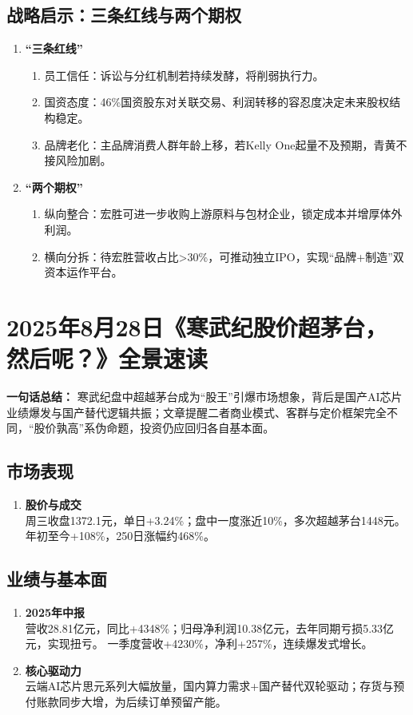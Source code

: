 \subsection{战略启示：三条红线与两个期权}
\begin{enumerate}[leftmargin=*, nosep]
    \item \textbf{“三条红线”  }
    \begin{enumerate}[label=\arabic*)]  
        \item 员工信任：诉讼与分红机制若持续发酵，将削弱执行力。  
        \item 国资态度：46\%国资股东对关联交易、利润转移的容忍度决定未来股权结构稳定。  
        \item 品牌老化：主品牌消费人群年龄上移，若Kelly One起量不及预期，青黄不接风险加剧。
    \end{enumerate}
    \item \textbf{“两个期权”}  
    \begin{enumerate}[label=\arabic*)]  
        \item 纵向整合：宏胜可进一步收购上游原料与包材企业，锁定成本并增厚体外利润。  
        \item 横向分拆：待宏胜营收占比>30\%，可推动独立IPO，实现“品牌+制造”双资本运作平台。
    \end{enumerate}
\end{enumerate}

\clearpage

\section{2025年8月28日《寒武纪股价超茅台，然后呢？》全景速读}
\textbf{一句话总结：}  
寒武纪盘中超越茅台成为“股王”引爆市场想象，背后是国产AI芯片业绩爆发与国产替代逻辑共振；文章提醒二者商业模式、客群与定价框架完全不同，“股价孰高”系伪命题，投资仍应回归各自基本面。

\subsection{市场表现}
\begin{enumerate}[leftmargin=*, nosep]
    \item \textbf{股价与成交}  \\
    周三收盘1372.1元，单日+3.24\%；盘中一度涨近10\%，多次超越茅台1448元。  
    年初至今+108\%，250日涨幅约468\%。
\end{enumerate}

\subsection{业绩与基本面}
\begin{enumerate}[leftmargin=*, nosep]
    \item \textbf{2025年中报}  \\
    营收28.81亿元，同比+4348\%；归母净利润10.38亿元，去年同期亏损5.33亿元，实现扭亏。  
    一季度营收+4230\%，净利+257\%，连续爆发式增长。
    \item \textbf{核心驱动力}  \\
    云端AI芯片思元系列大幅放量，国内算力需求+国产替代双轮驱动；存货与预付账款同步大增，为后续订单预留产能。
\end{enumerate}

